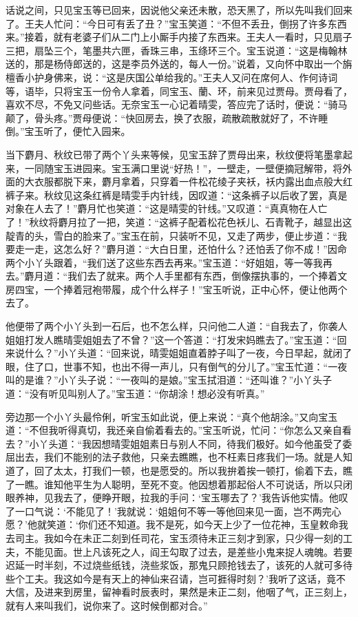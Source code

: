 \documentclass[12pt,oneside]{book}
\begin{document}
话说之间，只见宝玉等已回来，因说他父亲还未散，恐天黑了，所以先叫我们回来了。王夫人忙问：“今日可有丢了丑？”宝玉笑道：“不但不丢丑，倒拐了许多东西来。”接着，就有老婆子们从二门上小厮手内接了东西来。王夫人一看时，只见扇子三把，扇坠三个，笔墨共六匣，香珠三串，玉绦环三个。宝玉说道：“这是梅翰林送的，那是杨侍郎送的，这是李员外送的，每人一份。”说着，又向怀中取出一个旃檀香小护身佛来，说：“这是庆国公单给我的。”王夫人又问在席何人、作何诗词等，语毕，只将宝玉一份令人拿着，同宝玉、蘭、环，前来见过贾母。贾母看了，喜欢不尽，不免又问些话。无奈宝玉一心记着晴雯，答应完了话时，便说：“骑马颠了，骨头疼。”贾母便说：“快回房去，换了衣服，疏散疏散就好了，不许睡倒。”宝玉听了，便忙入园来。

当下麝月、秋纹已带了两个丫头来等候，见宝玉辞了贾母出来，秋纹便将笔墨拿起来，一同随宝玉进园来。宝玉满口里说“好热！”，一壁走，一壁便摘冠解带，将外面的大衣服都脱下来，麝月拿着，只穿着一件松花绫子夹袄，袄内露出血点般大红裤子来。秋纹见这条红裤是晴雯手内针线，因叹道：“这条裤子以后收了罢，真是对象在人去了！”麝月忙也笑道：“这是晴雯的针线。”又叹道：“真真物在人亡了！”秋纹将麝月拉了一把，笑道：“这裤子配着松花色袄儿、石青靴子，越显出这靛青的头，雪白的脸来了。”宝玉在前，只装听不见，又走了两步，便止步道：“我要走一走，这怎么好？”麝月道：“大白日里，还怕什么？还怕丢了你不成！”因命两个小丫头跟着，“我们送了这些东西去再来。”宝玉道：“好姐姐，等一等我再去。”麝月道：“我们去了就来。两个人手里都有东西，倒像摆执事的，一个捧着文房四宝，一个捧着冠袍带履，成个什么样子！”宝玉听说，正中心怀，便让他两个去了。

他便带了两个小丫头到一石后，也不怎么样，只问他二人道：“自我去了，你袭人姐姐打发人瞧晴雯姐姐去了不曾？”这一个答道：“打发宋妈瞧去了。”宝玉道：“回来说什么？”小丫头道：“回来说，晴雯姐姐直着脖子叫了一夜，今日早起，就闭了眼，住了口，世事不知，也出不得一声儿，只有倒气的分儿了。”宝玉忙道：“一夜叫的是谁？”小丫头子说：“一夜叫的是娘。”宝玉拭泪道：“还叫谁？”小丫头子道：“没有听见叫别人了。”宝玉道：“你胡涂！想必没有听真。”

旁边那一个小丫头最伶俐，听宝玉如此说，便上来说：“真个他胡涂。”又向宝玉道：“不但我听得真切，我还亲自偷着看去的。”宝玉听说，忙问：“你怎么又亲自看去？”小丫头道：“我因想晴雯姐姐素日与别人不同，待我们极好。如今他虽受了委屈出去，我们不能别的法子救他，只亲去瞧瞧，也不枉素日疼我们一场。就是人知道了，回了太太，打我们一顿，也是愿受的。所以我拚着挨一顿打，偷着下去，瞧了一瞧。谁知他平生为人聪明，至死不变。他因想着那起俗人不可说话，所以只闭眼养神，见我去了，便睁开眼，拉我的手问：‘宝玉哪去了？’我告诉他实情。他叹了一口气说：‘不能见了！’我就说：‘姐姐何不等一等他回来见一面，岂不两完心愿？’他就笑道：‘你们还不知道。我不是死，如今天上少了一位花神，玉皇敕命我去司主。我如今在未正二刻到任司花，宝玉须待未正三刻才到家，只少得一刻的工夫，不能见面。世上凡该死之人，阎王勾取了过去，是差些小鬼来捉人魂魄。若要迟延一时半刻，不过烧些纸钱，浇些浆饭，那鬼只顾抢钱去了，该死的人就可多待些个工夫。我这如今是有天上的神仙来召请，岂可捱得时刻？’我听了这话，竟不大信，及进来到房里，留神看时辰表时，果然是未正二刻，他咽了气，正三刻上，就有人来叫我们，说你来了。这时候倒都对合。”
\end{document}
